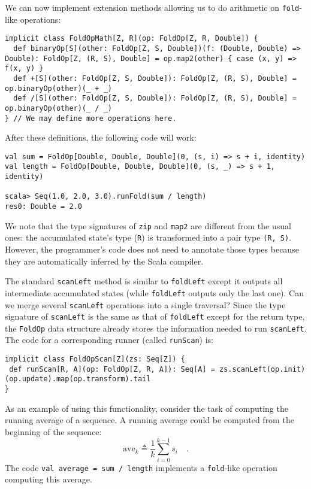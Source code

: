 We can now implement extension methods allowing us to do arithmetic
on \lstinline!fold!-like operations:
\begin{lstlisting}
implicit class FoldOpMath[Z, R](op: FoldOp[Z, R, Double]) {
  def binaryOp[S](other: FoldOp[Z, S, Double])(f: (Double, Double) => Double): FoldOp[Z, (R, S), Double] = op.map2(other) { case (x, y) => f(x, y) }
  def +[S](other: FoldOp[Z, S, Double]): FoldOp[Z, (R, S), Double] = op.binaryOp(other)(_ + _) 
  def /[S](other: FoldOp[Z, S, Double]): FoldOp[Z, (R, S), Double] = op.binaryOp(other)(_ / _) 
} // We may define more operations here.
\end{lstlisting}

After these definitions, the following code will work:
\begin{lstlisting}
val sum = FoldOp[Double, Double, Double](0, (s, i) => s + i, identity)
val length = FoldOp[Double, Double, Double](0, (s, _) => s + 1, identity)

scala> Seq(1.0, 2.0, 3.0).runFold(sum / length)
res0: Double = 2.0
\end{lstlisting}

We note that the type signatures of \lstinline!zip! and \lstinline!map2!
are different from the usual ones: the accumulated state\textsf{'}s type (\lstinline!R!)
is transformed into a pair type \lstinline!(R, S)!. However, the
programmer\textsf{'}s code does not need to annotate those types because they
are automatically inferred by the Scala compiler.

The standard \lstinline!scanLeft! method is similar to \lstinline!foldLeft!
except it outputs all intermediate accumulated states (while \lstinline!foldLeft!
outputs only the last one). Can we merge several \lstinline!scanLeft!
operations into a single traversal? Since the type signature of \lstinline!scanLeft!
is the same as that of \lstinline!foldLeft! except for the return
type, the \lstinline!FoldOp! data structure already stores the information
needed to run \lstinline!scanLeft!. The code for a corresponding
runner (called \lstinline!runScan!) is:
\begin{lstlisting}
implicit class FoldOpScan[Z](zs: Seq[Z]) {
 def runScan[R, A](op: FoldOp[Z, R, A]): Seq[A] = zs.scanLeft(op.init)(op.update).map(op.transform).tail
}
\end{lstlisting}

As an example of using this functionality, consider the task of computing
the running average of a sequence. A running average could be computed
from the beginning of the sequence:
\[
\text{ave}_{k}\triangleq\frac{1}{k}\sum_{i=0}^{k-1}s_{i}\quad.
\]
The code \lstinline!val average = sum / length! implements a \lstinline!fold!-like
operation computing this average.

